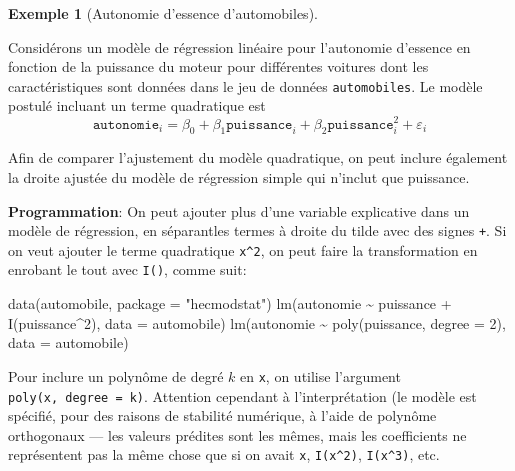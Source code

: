 \documentclass[
  11pt,
  letterpaper,
]{scrbook}
\newenvironment{Shaded}{\begin{snugshade}}{\end{snugshade}}
\newcommand{\AttributeTok}[1]{\textcolor[rgb]{0.40,0.45,0.13}{#1}}
\newcommand{\DecValTok}[1]{\textcolor[rgb]{0.68,0.00,0.00}{#1}}
\newcommand{\FunctionTok}[1]{\textcolor[rgb]{0.28,0.35,0.67}{#1}}
\newcommand{\NormalTok}[1]{\textcolor[rgb]{0.00,0.23,0.31}{#1}}
\newcommand{\SpecialCharTok}[1]{\textcolor[rgb]{0.37,0.37,0.37}{#1}}
\newcommand{\StringTok}[1]{\textcolor[rgb]{0.13,0.47,0.30}{#1}}
\theoremstyle{definition}
\newtheorem{example}{Exemple}[chapter]
\theoremstyle{remark}
\begin{document}
\begin{example}[Autonomie d'essence
d'automobiles]\protect\hypertarget{exm-automobile}{}\label{exm-automobile}

Considérons un modèle de régression linéaire pour l'autonomie d'essence
en fonction de la puissance du moteur pour différentes voitures dont les
caractéristiques sont données dans le jeu de données
\texttt{automobiles}. Le modèle postulé incluant un terme quadratique
est \[
\texttt{autonomie}_i = \beta_0 + \beta_1 \texttt{puissance}_i + \beta_2 \texttt{puissance}_i^2 + \varepsilon_i
\]

Afin de comparer l'ajustement du modèle quadratique, on peut inclure
également la droite ajustée du modèle de régression simple qui n'inclut
que puissance.

\textbf{Programmation}: On peut ajouter plus d'une variable explicative
dans un modèle de régression, en séparantles termes à droite du tilde
avec des signes \texttt{+}. Si on veut ajouter le terme quadratique
\texttt{x\^{}2}, on peut faire la transformation en enrobant le tout
avec \texttt{I()}, comme suit:

\begin{Shaded}
\begin{Highlighting}[]
\FunctionTok{data}\NormalTok{(automobile, }\AttributeTok{package =} \StringTok{"hecmodstat"}\NormalTok{)}
\FunctionTok{lm}\NormalTok{(autonomie }\SpecialCharTok{\textasciitilde{}}\NormalTok{ puissance }\SpecialCharTok{+} \FunctionTok{I}\NormalTok{(puissance}\SpecialCharTok{\^{}}\DecValTok{2}\NormalTok{),  }\AttributeTok{data =}\NormalTok{ automobile)}
\FunctionTok{lm}\NormalTok{(autonomie }\SpecialCharTok{\textasciitilde{}} \FunctionTok{poly}\NormalTok{(puissance, }\AttributeTok{degree =} \DecValTok{2}\NormalTok{),  }\AttributeTok{data =}\NormalTok{ automobile)}
\end{Highlighting}
\end{Shaded}

Pour inclure un polynôme de degré \(k\) en \texttt{x}, on utilise
l'argument \texttt{poly(x,\ degree\ =\ k)}. Attention cependant à
l'interprétation (le modèle est spécifié, pour des raisons de stabilité
numérique, à l'aide de polynôme orthogonaux --- les valeurs prédites
sont les mêmes, mais les coefficients ne représentent pas la même chose
que si on avait \texttt{x}, \texttt{I(x\^{}2)}, \texttt{I(x\^{}3)}, etc.

\begin{figure}[ht!]


\end{figure}
\end{example}
\end{document}
